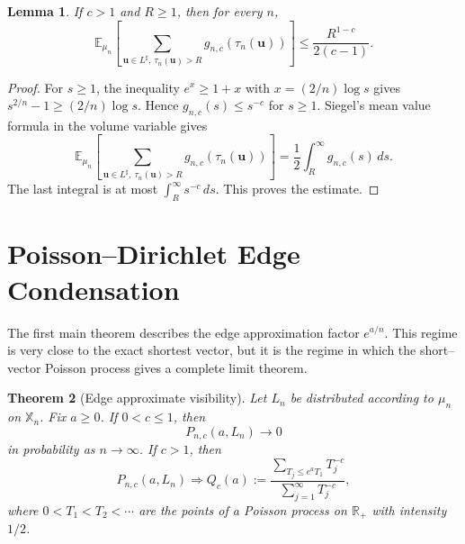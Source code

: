 \documentclass[a4paper,12pt]{article}
\newtheorem{thm}{Theorem}
\newtheorem{lem}[thm]{Lemma}
\theoremstyle{definition}
\theoremstyle{remark}
\newcommand{\re}{\mathbb R}
\newcommand{\ex}{\mathbb E}
\begin{document}
\begin{lem}
\label{lem:tail}
If $c>1$ and $R\ge1$, then for every $n$,
$$
\ex_{\mu_n}\left[\sum_{\bm u\in L^\sharp,\ \tau_n(\bm u)>R}
 g_{n,c}(\tau_n(\bm u))\right]
\le
\frac{R^{1-c}}{2(c-1)}.
$$
\end{lem}

\begin{proof}
For $s\ge1$, the inequality $e^x\ge1+x$ with $x=(2/n)\log s$ gives $s^{2/n}-1\ge(2/n)\log s$.
Hence $g_{n,c}(s)\le s^{-c}$ for $s\ge1$.
Siegel's mean value formula \cite{Siegel45} in the volume variable gives
$$
\ex_{\mu_n}\left[\sum_{\bm u\in L^\sharp,\ \tau_n(\bm u)>R}
 g_{n,c}(\tau_n(\bm u))\right]
=
\frac{1}{2}\int_R^\infty g_{n,c}(s)\,ds.
$$
The last integral is at most $\int_R^\infty s^{-c}\,ds$.
This proves the estimate.
\end{proof}

\section{Poisson--Dirichlet Edge Condensation}
\label{sec:edge}

The first main theorem describes the edge approximation factor $e^{a/n}$.
This regime is very close to the exact shortest vector, but it is the regime in which the short--vector Poisson process gives a complete limit theorem.

\begin{thm}[Edge approximate visibility]
\label{thm:edge}
Let $L_n$ be distributed according to $\mu_n$ on $\mathbb X_n$.
Fix $a\ge0$.
If $0<c\le1$, then
$$
P_{n,c}(a,L_n)\to0
$$
in probability as $n\to\infty$.
If $c>1$, then
$$
P_{n,c}(a,L_n)
\Rightarrow
Q_c(a):=
\frac{\sum_{T_j\le e^aT_1}T_j^{-c}}
{\sum_{j=1}^{\infty}T_j^{-c}},
$$
where $0<T_1<T_2<\cdots$ are the points of a Poisson process on $\re_+$ with intensity $1/2$.
\end{thm}
\end{document}
